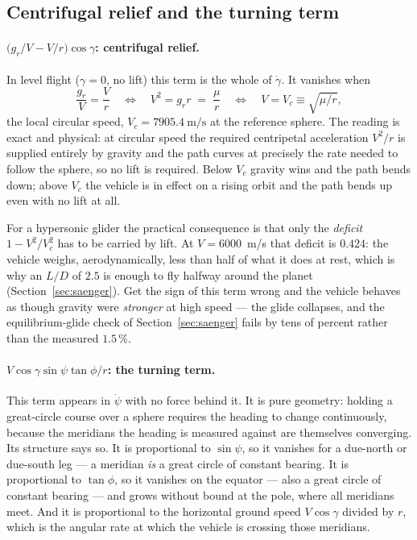 \documentclass[11pt]{article}
\begin{document}
\subsection{Centrifugal relief and the turning term}
\label{sec:relief}

\paragraph{$\bigl(g_r/V - V/r\bigr)\cos\gamma$: centrifugal relief.}
In level flight ($\gamma=0$, no lift) this term is the whole of
$\dot\gamma$. It vanishes when
\begin{equation}
  \frac{g_r}{V} = \frac{V}{r}
  \quad\Longleftrightarrow\quad
  V^2 = g_r r \;=\; \frac{\mu}{r}
  \quad\Longleftrightarrow\quad
  V = V_c \equiv \sqrt{\mu/r} ,
  \label{eq:circular}
\end{equation}
the local circular speed, $V_c = 7905.4~\mathrm{m/s}$ at the reference sphere.
The reading is exact and physical: at circular speed the required centripetal
acceleration $V^2/r$ is supplied entirely by gravity and the path curves at
precisely the rate needed to follow the sphere, so no lift is required. Below
$V_c$ gravity wins and the path bends down; above $V_c$ the vehicle is in
effect on a rising orbit and the path bends up even with no lift at all.

For a hypersonic glider the practical consequence is that only the
\emph{deficit} $1 - V^2/V_c^2$ has to be carried by lift. At $V=6000$~m/s that
deficit is $0.424$: the vehicle weighs, aerodynamically, less than half of what
it does at rest, which is why an $L/D$ of $2.5$ is enough to fly halfway around
the planet (Section~\ref{sec:saenger}). Get the sign of this term wrong and the
vehicle behaves as though gravity were \emph{stronger} at high speed --- the
glide collapses, and the equilibrium-glide check of
Section~\ref{sec:saenger} fails by tens of percent rather than the measured
$1.5\,\%$.

\paragraph{$V\cos\gamma\sin\psi\tan\phi/r$: the turning term.}
This term appears in $\dot\psi$ with no force behind it. It is pure geometry:
holding a great-circle course over a sphere requires the heading to change
continuously, because the meridians the heading is measured against are
themselves converging. Its structure says so. It is proportional to
$\sin\psi$, so it vanishes for a due-north or due-south leg --- a meridian
\emph{is} a great circle of constant bearing. It is proportional to $\tan\phi$,
so it vanishes on the equator --- also a great circle of constant bearing ---
and grows without bound at the pole, where all meridians meet. And it is
proportional to the horizontal ground speed $V\cos\gamma$ divided by $r$, which
is the angular rate at which the vehicle is crossing those meridians.
\end{document}
